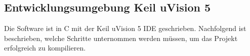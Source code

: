 \subsection{Entwicklungsumgebung Keil uVision 5}
\label{sec:IDE}

Die Software ist in C mit der Keil uVision 5 IDE geschrieben. Nachfolgend ist beschrieben, welche Schritte unternommen werden müssen, um das Projekt erfolgreich zu kompilieren.

